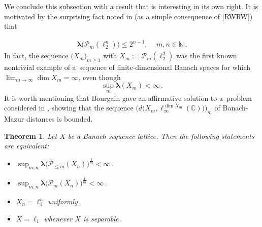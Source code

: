 \documentclass[12pt]{amsart}
\numberwithin{subsection}{section}
\newtheorem{theorem}{Theorem}[section]
\theoremstyle{definition}
\theoremstyle{remark}
\begin{document}
We conclude this subsection with a result that is interesting in its own right. It is motivated by the surprising fact
noted in \cite{ryll1983homogeneous} (as a simple consequence of \eqref{RWRW}) that


\begin{align*} %
\boldsymbol{\lambda}\big(\mathcal{P}_m(\ell_2^n)\big) \leq 2^{n-1}, \quad\, m,n\in \mathbb{N}\,.
\end{align*}
In fact, the sequence $\big(X_m\big)_{m \geq 1}$ with $X_m := \mathcal{P}_m(\ell_2^2)$ was the first known nontrivial example of
a~sequence of finite-dimensional Banach spaces for which $\lim_{m \to \infty} \dim X_m = \infty$, even though
\[
\sup_m \boldsymbol{\lambda}(X_m) < \infty\,.
\]
It is worth mentioning that Bourgain \cite{bourgain1989} gave an affirmative solution to a~problem considered in \cite{ryll1983homogeneous},
showing that the sequence $\big(d\big(X_m, \ell_\infty^{\dim X_m}(\mathbb{C})\big)\big)_m$ of Banach-Mazur distances is bounded.

\begin{theorem} \label{Xl1}
Let $X$ be a Banach sequence lattice. Then the following statements are equivalent{\rm:}
\begin{itemize}
\item[{\rm(i)}] $\sup_{m,n} \boldsymbol{\lambda}\big(\mathcal{P}_{ \leq m}(X_n)\big)^\frac{1}{m} < \infty$\,.
\item[{\rm(ii)}] $\sup_{m,n} \boldsymbol{\lambda}\big(\mathcal{P}_{ m}(X_n)\big)^\frac{1}{m} < \infty$\,.
\item[{\rm(iii)}] $X_n = \ell_1^n$ uniformly\,.
\item[{\rm(iv)}] $X=\ell_1$ whenever $X$ is separable\,.
\end{itemize}
\end{theorem}
\end{document}

